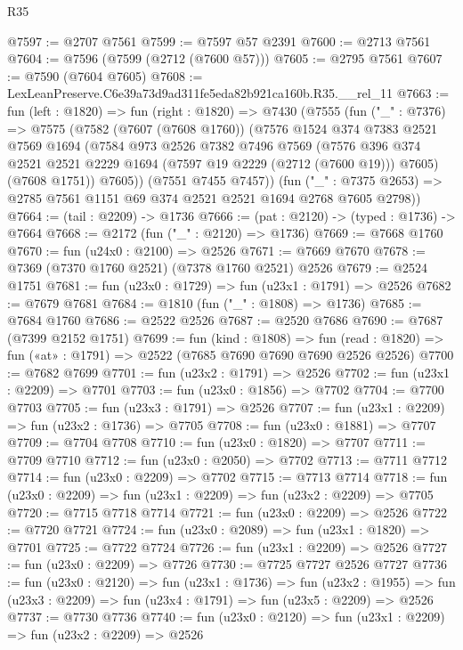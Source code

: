 \begin{lexlean}{R35}
\begin{coremodule}
@7597 := @2707 @7561
@7599 := @7597 @57 @2391
@7600 := @2713 @7561
@7604 := @7596 (@7599 (@2712 (@7600 @57)))
@7605 := @2795 @7561
@7607 := @7590 (@7604 @7605)
@7608 := LexLeanPreserve.C6e39a73d9ad311fe5eda82b921ca160b.R35.__rel_11
@7663 := fun (left : @1820) =>
  fun (right : @1820) =>
  @7430
    (@7555
      (fun ("_" : @7376) =>
      @7575
        (@7582
          (@7607 (@7608 @1760))
          (@7576
            @1524
            @374
            @7383
            @2521
            @7569
            @1694
            (@7584
              @973
              @2526
              @7382
              @7496
              @7569
              (@7576 @396 @374 @2521 @2521 @2229 @1694 (@7597 @19 @2229 (@2712 (@7600 @19))) @7605)
              (@7608 @1751))
            @7605))
        (@7551 @7455 @7457))
      (fun ("_" : @7375 @2653) => @2785 @7561 @1151 @69 @374 @2521 @2521 @1694 @2768 @7605 @2798))
@7664 := (tail : @2209) -> @1736
@7666 := (pat : @2120) -> (typed : @1736) -> @7664
@7668 := @2172 (fun ("_" : @2120) => @1736)
@7669 := @7668 @1760
@7670 := fun (u24x0 : @2100) => @2526
@7671 := @7669 @7670
@7678 := @7369 (@7370 @1760 @2521) (@7378 @1760 @2521) @2526
@7679 := @2524 @1751
@7681 := fun (u23x0 : @1729) => fun (u23x1 : @1791) => @2526
@7682 := @7679 @7681
@7684 := @1810 (fun ("_" : @1808) => @1736)
@7685 := @7684 @1760
@7686 := @2522 @2526
@7687 := @2520 @7686
@7690 := @7687 (@7399 @2152 @1751)
@7699 := fun (kind : @1808) =>
  fun (read : @1820) => fun («at» : @1791) => @2522 (@7685 @7690 @7690 @7690 @2526 @2526)
@7700 := @7682 @7699
@7701 := fun (u23x2 : @1791) => @2526
@7702 := fun (u23x1 : @2209) => @7701
@7703 := fun (u23x0 : @1856) => @7702
@7704 := @7700 @7703
@7705 := fun (u23x3 : @1791) => @2526
@7707 := fun (u23x1 : @2209) => fun (u23x2 : @1736) => @7705
@7708 := fun (u23x0 : @1881) => @7707
@7709 := @7704 @7708
@7710 := fun (u23x0 : @1820) => @7707
@7711 := @7709 @7710
@7712 := fun (u23x0 : @2050) => @7702
@7713 := @7711 @7712
@7714 := fun (u23x0 : @2209) => @7702
@7715 := @7713 @7714
@7718 := fun (u23x0 : @2209) => fun (u23x1 : @2209) => fun (u23x2 : @2209) => @7705
@7720 := @7715 @7718 @7714
@7721 := fun (u23x0 : @2209) => @2526
@7722 := @7720 @7721
@7724 := fun (u23x0 : @2089) => fun (u23x1 : @1820) => @7701
@7725 := @7722 @7724
@7726 := fun (u23x1 : @2209) => @2526
@7727 := fun (u23x0 : @2209) => @7726
@7730 := @7725 @7727 @2526 @7727
@7736 := fun (u23x0 : @2120) =>
  fun (u23x1 : @1736) =>
  fun (u23x2 : @1955) => fun (u23x3 : @2209) => fun (u23x4 : @1791) => fun (u23x5 : @2209) => @2526
@7737 := @7730 @7736
@7740 := fun (u23x0 : @2120) => fun (u23x1 : @2209) => fun (u23x2 : @2209) => @2526

\end{coremodule}
\end{lexlean}
